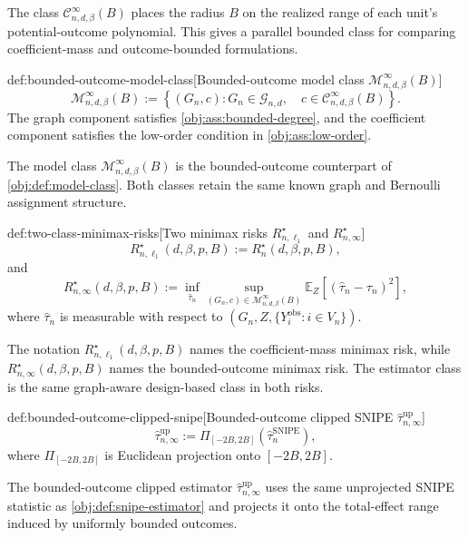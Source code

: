 \documentclass[11pt]{article}
\begin{document}
The class \(\mathcal C_{n,d,\beta}^{\infty}(B)\) places the radius \(B\) on the realized range of each unit's potential-outcome polynomial. This gives a parallel bounded class for comparing coefficient-mass and outcome-bounded formulations.

\begin{definitionv}{def:bounded-outcome-model-class}[Bounded-outcome model class $\mathcal M_{n,d,\beta}^{\infty}(B)$]
\[
\mathcal M_{n,d,\beta}^{\infty}(B)
:=
\left\{
(G_n,c):
G_n\in\mathcal G_{n,d},\quad
c\in\mathcal C_{n,d,\beta}^{\infty}(B)
\right\}.
\]
The graph component satisfies \cref{obj:ass:bounded-degree}, and the coefficient component satisfies the low-order condition in \cref{obj:ass:low-order}.
\end{definitionv}

The model class \(\mathcal M_{n,d,\beta}^{\infty}(B)\) is the bounded-outcome counterpart of \cref{obj:def:model-class}. Both classes retain the same known graph and Bernoulli assignment structure.

\begin{definitionv}{def:two-class-minimax-risks}[Two minimax risks $R_{n,\ell_1}^{\star}$ and $R_{n,\infty}^{\star}$]
\[
R_{n,\ell_1}^{\star}(d,\beta,p,B)
:=
R_n^\star(d,\beta,p,B),
\]
and
\[
R_{n,\infty}^{\star}(d,\beta,p,B)
:=
\inf_{\widehat\tau_n}
\sup_{(G_n,c)\in\mathcal M_{n,d,\beta}^{\infty}(B)}
\mathbb E_Z\!\left[
\left(\widehat\tau_n-\tau_n\right)^2
\right],
\]
where \(\widehat\tau_n\) is measurable with respect to \((G_n,Z,\{Y_i^{\mathrm{obs}}:i\in V_n\})\).
\end{definitionv}

The notation \(R_{n,\ell_1}^{\star}(d,\beta,p,B)\) names the coefficient-mass minimax risk, while \(R_{n,\infty}^{\star}(d,\beta,p,B)\) names the bounded-outcome minimax risk. The estimator class is the same graph-aware design-based class in both risks.

\begin{definitionv}{def:bounded-outcome-clipped-snipe}[Bounded-outcome clipped SNIPE $\widehat\tau_{n,\infty}^{\mathrm{up}}$]
\[
\widehat\tau_{n,\infty}^{\mathrm{up}}
:=
\Pi_{[-2B,2B]}\!\left(\widehat\tau_n^{\mathrm{SNIPE}}\right),
\]
where \(\Pi_{[-2B,2B]}\) is Euclidean projection onto \([-2B,2B]\).
\end{definitionv}

The bounded-outcome clipped estimator \(\widehat\tau_{n,\infty}^{\mathrm{up}}\) uses the same unprojected SNIPE statistic as \cref{obj:def:snipe-estimator} and projects it onto the total-effect range induced by uniformly bounded outcomes.
\end{document}
